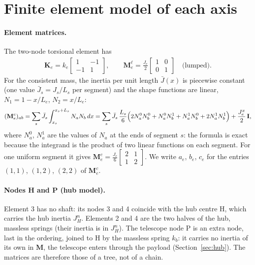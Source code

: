 \documentclass[10pt,a4paper]{article}
\numberwithin{equation}{section}
\begin{document}
\section{\texorpdfstring{Finite element model of each axis}{Finite element model of each axis}}\label{sec:fem}
\paragraph{Element matrices.} The two-node torsional element has
\begin{gather}
\mathbf K_e = k_e\begin{bmatrix}1&-1\\-1&1\end{bmatrix}, \qquad
\mathbf M_e^{\ell} = \frac{J_e}{2}\begin{bmatrix}1&0\\0&1\end{bmatrix} \quad\text{(lumped)}.
\end{gather}
For the consistent mass, the inertia per unit length $\bar J(x)$ is piecewise constant (one value $\bar J_s = J_s/L_s$ per segment) and the shape functions are linear, $N_1 = 1 - x/L_e$, $N_2 = x/L_e$:
\begin{gather}
(\mathbf M_e^{c})_{ab} = \sum_s \bar J_s\int_{x_s}^{x_s+L_s} N_a N_b\,dx
= \sum_s \bar J_s\,\frac{L_s}{6}\Bigl(2N_a^0N_b^0 + N_a^0N_b^1 + N_a^1N_b^0 + 2N_a^1N_b^1\Bigr)
+ \frac{J^{x}_e}{2}\,\mathbf I,
\end{gather}
where $N_a^0$, $N_a^1$ are the values of $N_a$ at the ends of segment $s$: the formula is exact because the integrand is the product of two linear functions on each segment. For one uniform segment it gives $\mathbf M_e^{c} = \frac{J_e}{6}\left[\begin{smallmatrix}2&1\\1&2\end{smallmatrix}\right]$. We write $a_e$, $b_e$, $c_e$ for the entries $(1,1)$, $(1,2)$, $(2,2)$ of $\mathbf M_e^{c}$.
\paragraph{Nodes H and P (hub model).} Element 3 has no shaft: its nodes 3 and 4 coincide with the hub centre H, which carries the hub inertia $J^n_H$. Elements 2 and 4 are the two halves of the hub, massless springs (their inertia is in $J^n_H$). The telescope node P is an extra node, last in the ordering, joined to H by the massless spring $k_b$: it carries no inertia of its own in $\mathbf M$, the telescope enters through the payload (Section~\ref{sec:hub}). The matrices are therefore those of a tree, not of a chain.
\end{document}
